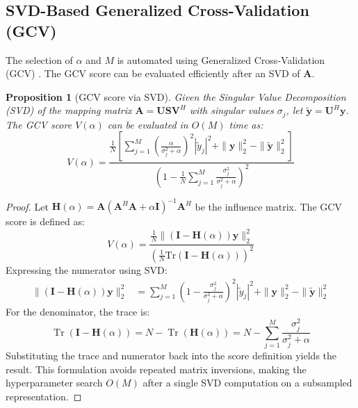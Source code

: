 \documentclass[11pt,a4paper]{article}
\newtheorem{proposition}{Proposition}
\begin{document}
\subsection{SVD-Based Generalized Cross-Validation (GCV)}
The selection of $\alpha$ and $M$ is automated using Generalized Cross-Validation (GCV) \cite{Wahba1979}. The GCV score can be evaluated efficiently after an SVD of $\mathbf{A}$.

\begin{proposition}[GCV score via SVD]
Given the Singular Value Decomposition (SVD) of the mapping matrix $\mathbf{A} = \mathbf{U} \mathbf{S} \mathbf{V}^H$ with singular values $\sigma_j$, let $\tilde{\mathbf{y}} = \mathbf{U}^H \mathbf{y}$. The GCV score $V(\alpha)$ can be evaluated in $O(M)$ time as:
\begin{equation}
V(\alpha) = \frac{\frac{1}{N} \left[ \sum_{j=1}^{M} \left( \frac{\alpha}{\sigma_j^2 + \alpha} \right)^2 |\tilde{y}_j|^2 + \|\mathbf{y}\|_2^2 - \|\tilde{\mathbf{y}}\|_2^2 \right]}{\left( 1 - \frac{1}{N} \sum_{j=1}^{M} \frac{\sigma_j^2}{\sigma_j^2 + \alpha} \right)^2}
\end{equation}
\end{proposition}

\begin{proof}
Let $\mathbf{H}(\alpha) = \mathbf{A}(\mathbf{A}^H\mathbf{A} + \alpha\mathbf{I})^{-1}\mathbf{A}^H$ be the influence matrix. The GCV score is defined as:
\begin{equation}
V(\alpha) = \frac{\frac{1}{N} \|(\mathbf{I} - \mathbf{H}(\alpha))\mathbf{y}\|_2^2}{\left(\frac{1}{N} \text{Tr}(\mathbf{I} - \mathbf{H}(\alpha))\right)^2}
\end{equation}
Expressing the numerator using SVD:
\begin{align}
\|(\mathbf{I} - \mathbf{H}(\alpha))\mathbf{y}\|_2^2 &= \sum_{j=1}^{M} \left( 1 - \frac{\sigma_j^2}{\sigma_j^2 + \alpha} \right)^2 |\tilde{y}_j|^2 + \|\mathbf{y}\|_2^2 - \|\tilde{\mathbf{y}}\|_2^2
\end{align}
For the denominator, the trace is:
\begin{equation}
\operatorname{Tr}(\mathbf{I} - \mathbf{H}(\alpha)) = N - \operatorname{Tr}(\mathbf{H}(\alpha)) = N - \sum_{j=1}^{M} \frac{\sigma_j^2}{\sigma_j^2 + \alpha}
\end{equation}
Substituting the trace and numerator back into the score definition yields the result. This formulation avoids repeated matrix inversions, making the hyperparameter search $O(M)$ after a single SVD computation on a subsampled representation.
\end{proof}
\end{document}
